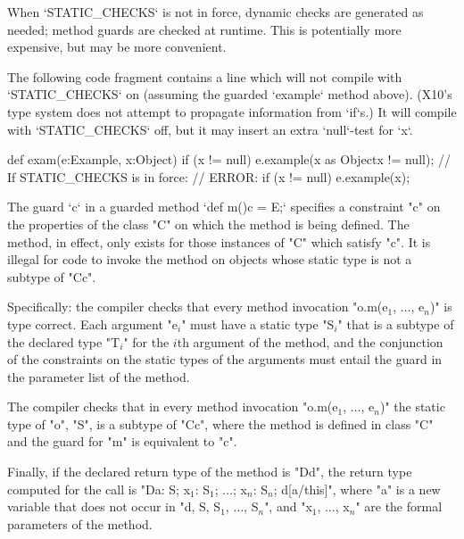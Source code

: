 When \xcd`STATIC_CHECKS` is not in force, dynamic checks are generated as
needed; method guards are checked at runtime. This is potentially more
expensive, but may be more convenient. 

\begin{ex}
The following code fragment contains a line which will not compile 
with \xcd`STATIC_CHECKS` on (assuming the guarded \xcd`example` method above).  (X10's type system does not attempt to propagate 
information from \xcd`if`s.)  It will compile with \xcd`STATIC_CHECKS` off,
but it may insert an extra \xcd`null`-test for \xcd`x`.  
\begin{xten}
  def exam(e:Example, x:Object) {
    if (x != null) 
       e.example(x as Object{x != null});
       // If STATIC_CHECKS is in force: 
       // ERROR: if (x != null) e.example(x); 
  }
\end{xten}
\end{ex}


The guard \xcd`{c}` 
in a guarded method 
\xcd`def m(){c} = E;`
specifies a constraint \xcd"c" on the
properties of the class \xcd"C" on which the method is being defined. The
method, in effect, only exists  for those instances of \xcd"C" which satisfy
\xcd"c".  It is 
illegal for code to invoke the method on objects whose static type is
not a subtype of \xcd"C{c}".

Specifically: 
    the compiler checks that every method invocation
    \xcdmath"o.m(e$_1$, $\dots$, e$_n$)"
    is type correct. Each argument
    \xcdmath"e$_i$" must have a
    static type \xcdmath"S$_i$" that is a subtype of the declared type
    \xcdmath"T$_i$" for the $i$th
    argument of the method, and the conjunction of the constraints on the
    static types 
    of the arguments must entail the guard in the parameter list
    of the method.

    The compiler checks that in every method invocation
    \xcdmath"o.m(e$_1$, $\dots$, e$_n$)"
    the static type of \xcd"o", \xcd"S", is a subtype of \xcd"C{c}", where the method
    is defined in class \xcd"C" and the guard for \xcd"m" is equivalent to
    \xcd"c".

    Finally, if the declared return type of the method is
    \xcd"D{d}", the
    return type computed for the call is
    \xcdmath"D{a: S; x$_1$: S$_1$; $\dots$; x$_n$: S$_n$; d[a/this]}",
    where \xcd"a" is a new
    variable that does not occur in
    \xcdmath"d, S, S$_1$, $\dots$, S$_n$", and
    \xcdmath"x$_1$, $\dots$, x$_n$" are the formal
    parameters of the method.


